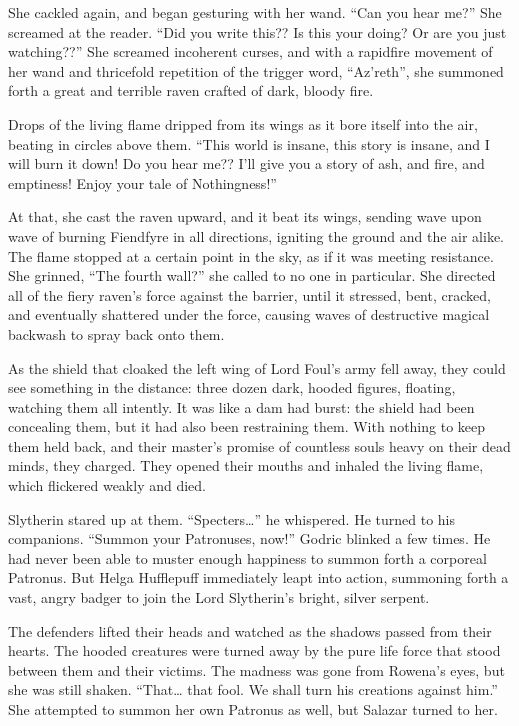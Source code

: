 She cackled again, and began gesturing with her wand. “Can you hear me?” She screamed at the reader. “Did you write this?? Is this your doing? Or are you just watching??” She screamed incoherent curses, and with a rapidfire movement of her wand and thricefold repetition of the trigger word, “Az’reth”, she summoned forth a great and terrible raven crafted of dark, bloody fire.

Drops of the living flame dripped from its wings as it bore itself into the air, beating in circles above them. “This world is insane, this story is insane, and I will burn it down! Do you hear me?? I’ll give you a story of ash, and fire, and emptiness! Enjoy your tale of Nothingness!”

At that, she cast the raven upward, and it beat its wings, sending wave upon wave of burning Fiendfyre in all directions, igniting the ground and the air alike. The flame stopped at a certain point in the sky, as if it was meeting resistance. She grinned, “The fourth wall?” she called to no one in particular. She directed all of the fiery raven’s force against the barrier, until it stressed, bent, cracked, and eventually shattered under the force, causing waves of destructive magical backwash to spray back onto them.

As the shield that cloaked the left wing of Lord Foul’s army fell away, they could see something in the distance: three dozen dark, hooded figures, floating, watching them all intently. It was like a dam had burst: the shield had been concealing them, but it had also been restraining them. With nothing to keep them held back, and their master’s promise of countless souls heavy on their dead minds, they charged. They opened their mouths and inhaled the living flame, which flickered weakly and died.

Slytherin stared up at them. “Specters…” he whispered. He turned to his companions. “Summon your Patronuses, now!” Godric blinked a few times. He had never been able to muster enough happiness to summon forth a corporeal Patronus. But Helga Hufflepuff immediately leapt into action, summoning forth a vast, angry badger to join the Lord Slytherin’s bright, silver serpent.

The defenders lifted their heads and watched as the shadows passed from their hearts. The hooded creatures were turned away by the pure life force that stood between them and their victims. The madness was gone from Rowena’s eyes, but she was still shaken. “That… that fool. We shall turn his creations against him.” She attempted to summon her own Patronus as well, but Salazar turned to her.

